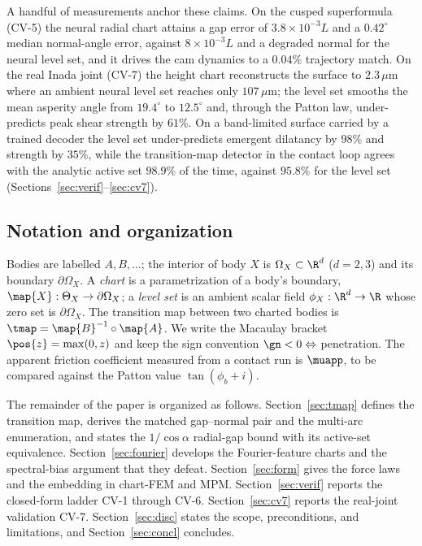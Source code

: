 A handful of measurements anchor these claims. On the cusped superformula (CV-5) the neural radial chart
attains a gap error of $3.8\times10^{-3}L$ and a $0.42^\circ$ median normal-angle error, against
$8\times10^{-3}L$ and a degraded normal for the neural level set, and it drives the cam dynamics to a
$0.04\%$ trajectory match. On the real Inada joint (CV-7) the height chart reconstructs the surface to
$2.3\,\mu$m where an ambient neural level set reaches only $107\,\mu$m; the level set smooths the mean
asperity angle from $19.4^\circ$ to $12.5^\circ$ and, through the Patton law, under-predicts peak shear
strength by $61\%$. On a band-limited surface carried by a trained decoder the level set under-predicts
emergent dilatancy by $98\%$ and strength by $35\%$, while the transition-map detector in the contact
loop agrees with the analytic active set $98.9\%$ of the time, against $95.8\%$ for the level set
(Sections~\ref{sec:verif}--\ref{sec:cv7}).

\subsection{Notation and organization}\label{sec:intro-notation}

Bodies are labelled $A,B,\dots$; the interior of body $X$ is $\Omega_X\subset\R^d$ ($d=2,3$) and its
boundary $\partial\Omega_X$. A \emph{chart} is a parametrization of a body's boundary,
$\map{X}:\Theta_X\to\partial\Omega_X$; a \emph{level set} is an ambient scalar field $\phi_X:\R^d\to\R$
whose zero set is $\partial\Omega_X$. The transition map between two charted bodies is
$\tmap=\map{B}^{-1}\circ\map{A}$. We write the Macaulay bracket $\pos{z}=\max(0,z)$ and keep the sign
convention $\gn<0\Leftrightarrow$ penetration. The apparent friction coefficient measured from a contact
run is $\muapp$, to be compared against the Patton value $\tan(\phi_b+i)$.

The remainder of the paper is organized as follows. Section~\ref{sec:tmap} defines the
transition map, derives the matched gap--normal pair and the multi-arc enumeration, and states the
$1/\cos\alpha$ radial-gap bound with its active-set equivalence. Section~\ref{sec:fourier} develops the
Fourier-feature charts and the spectral-bias argument that they defeat. Section~\ref{sec:form}
gives the force laws and the embedding in chart-FEM and MPM. Section~\ref{sec:verif} reports the
closed-form ladder CV-1 through CV-6. Section~\ref{sec:cv7} reports the real-joint validation
CV-7. Section~\ref{sec:disc} states the scope, preconditions, and limitations, and
Section~\ref{sec:concl} concludes.
